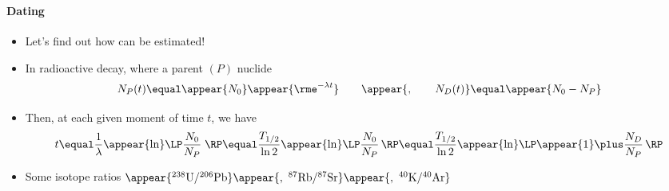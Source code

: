 \begin{frame}
\frametitle{\texorpdfstring{\culine[\sectiontitleulinecolor]{\sectiontitle}}{\sectiontitle} }
\framesubtitle{Dating}

\begin{itemize}
	\item Let's find out how  can be estimated!

\item In radioactive decay, where a parent $(P)$ nuclide  
\[
N_{P}(t)  \equal \appear{N_{0}} \appear{\rme^{-\lambda t}} \qquad \appear{, \qquad N_{D}(t)}  \equal \appear{N_{0}-N_{P}}
\]

\item Then, at each given moment of time $t$, we have 
\[
t \equal \frac{1}{\lambda} \appear{\ln} \LP \frac{N_{0}}{N_{P}} \;\RP  \equal \frac{T_{1 / 2}}{\ln 2} \appear{\ln} \LP \frac{N_{0}}{N_{P}} \,\RP  \equal \frac{T_{1 / 2}}{\ln 2} \appear{\ln} \LP \appear{1} \plus \frac{N_{D}}{N_{P}} \,\RP
\]

\item Some isotope ratios \appear{(}$\appear{{ }^{238} \mathrm{U} /{ }^{206} \mathrm{Pb}}\appear{,~{ }^{87} \mathrm{Rb} /{ }^{87} \mathrm{Sr}}\appear{,~{ }^{40} \mathrm{K} /{ }^{40} \mathrm{Ar}}$\appear{)} 
\end{itemize}


\endofslide 
\end{frame}

